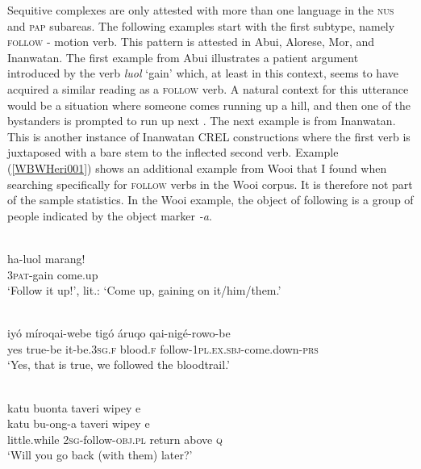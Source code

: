 Sequitive complexes are only attested with more than one language in the \textsc{nus} and \textsc{pap} subareas. The following examples start with the first subtype, namely \textsc{follow} - motion verb. This pattern is attested in Abui, Alorese, Mor, and Inanwatan. The first example from Abui illustrates a patient argument introduced by the verb \textit{luol} `gain' which, at least in this context, seems to have acquired a similar reading as a \textsc{follow} verb. A natural context for this utterance would be a situation where someone comes running up a hill, and then one of the bystanders is prompted to run up next \citep[362]{kratochvil2007grammar}. The next example is from Inanwatan. This is another instance of Inanwatan CREL constructions where the first verb is juxtaposed with a bare stem to the inflected second verb. Example (\ref{WBWHeri001}) shows an additional example from Wooi that I found when searching specifically for \textsc{follow} verbs in the Wooi corpus. It is therefore not part of the sample statistics. In the Wooi example, the object of following is a group of people indicated by the object marker \textit{-a}.

\ea \label{Abui059}
\\
\gll ha-luol marang! \\
\textsc{3}\textsc{pat}-gain come.up \\
\glft `Follow it up!’, lit.: `Come up, gaining on it/him/them.’ \\ 
\z

\ea \label{Inanwatan026}
\\
\gll iyó míroqai-webe tigó áruqo qai-nigé-rowo-be \\
yes true-be it-be.\textsc{3}\textsc{sg}.\textsc{f} blood.\textsc{f} follow-\textsc{1}\textsc{pl}.\textsc{ex}.\textsc{sbj}-come.down-\textsc{prs} \\
\glft `Yes, that is true, we followed the bloodtrail.'\\ 
\z

\ea \label{WBWHeri001}
\\
\glll katu buonta taveri wipey e \\
katu bu-ong-a taveri wipey e \\
little.while \textsc{2}\textsc{sg}-follow-\textsc{obj}.\textsc{pl} return above \textsc{q} \\
\glft `Will you go back (with them) later?' \\ 
\z

